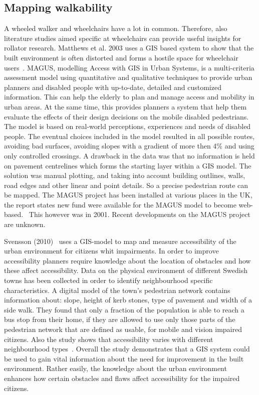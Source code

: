 \subsection{Mapping walkability}
A wheeled walker and wheelchairs have a lot in common. Therefore, also literature studies aimed specific at wheelchairs can provide useful insights for rollator research. Matthews et al. 2003 uses a GIS based system to show that the built environment is often distorted and forms a hostile space for wheelchair users~\cite{Matthews2003}. MAGUS, modelling Access with GIS in Urban Systems, is a multi-criteria assessment model using quantitative and qualitative techniques to provide urban planners and disabled people with up-to-date, detailed and customized information. This can help the elderly to plan and manage access and mobility in urban areas. At the same time, this provides planners a system that help them evaluate the effects of their design decisions on the mobile disabled pedestrians.~\cite{Matthews2003} The model is based on real-world perceptions, experiences and needs of disabled people. The eventual choices included in the model resulted in all possible routes, avoiding bad surfaces, avoiding slopes with a gradient of more then 4\% and using only controlled crossings. A drawback in the data was that no information is held on pavement centrelines which forms the starting layer within a GIS model. The solution was manual plotting, and taking into account building outlines, walls, road edges and other linear and point details. So a precise pedestrian route can be mapped. The MAGUS project has been installed at various places in the UK, the report states new fund were available for the MAGUS model to become web-based.~\cite{Matthews2003} This however was in 2001. Recent developments on the MAGUS project are unknown. 

Svensson (2010)~\cite{Svensson2010} uses a GIS-model to map and measure accessibility of the urban environment for citizens whit impairments. In order to improve accessibility planners require knowledge about the location of obstacles and how these affect accessibility. Data on the physical environment of different Swedish towns has been collected in order to identify neighbourhood specific characteristics. A digital model of the town's pedestrian network contains information about: slope, height of kerb stones, type of pavement and width of a side walk. They found that only a fraction of the population is able to reach a bus stop from their home, if they are allowed to use only those parts of the pedestrian network that are defined as usable, for mobile and vision impaired citizens. Also the study shows that accessibility varies with different neighbourhood types~\cite{Svensson2010}. Overall the study demonstrates that a GIS system could be used to gain vital information about the need for improvement in the built environment. Rather easily, the knowledge about the urban environment enhances how certain obstacles and flaws affect accessibility for the impaired citizens.~\cite{Svensson2010}

